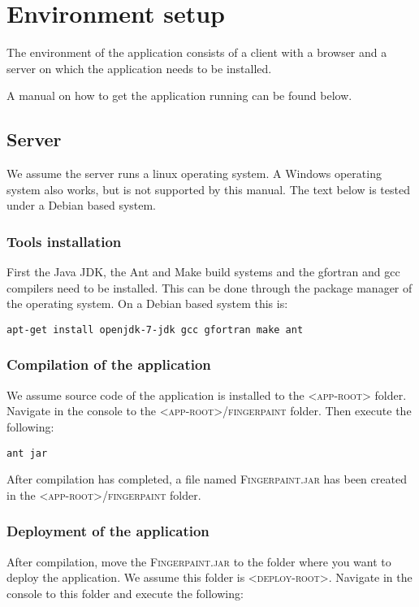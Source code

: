 \chapter{Environment setup}
\label{environment_setup}
The environment of the \applicationname{} application consists of a client with a browser and a server on which the application needs to be installed.

A manual on how to get the \applicationname{} application running can be found below.

\section{Server}
We assume the server runs a linux operating system. A Windows operating system also works, but is not supported by this manual. The text below is tested under a Debian based system.

\subsection{Tools installation}
First the Java JDK, the Ant and Make build systems and the gfortran and gcc compilers need to be installed. This can be done through the package manager of the operating system. On a Debian based system this is:

\begin{verbatim}
apt-get install openjdk-7-jdk gcc gfortran make ant
\end{verbatim}

\subsection{Compilation of the application}
We assume source code of the application is installed to the \textsc{<app-root>} folder. Navigate in the console to the \textsc{<app-root>/fingerpaint} folder. Then execute the following:

\begin{verbatim}
ant jar
\end{verbatim}

After compilation has completed, a file named \textsc{Fingerpaint.jar} has been created in the \textsc{<app-root>/fingerpaint} folder.

\subsection{Deployment of the application}
After compilation, move the \textsc{Fingerpaint.jar} to the folder where you want to deploy the application. We assume this folder is \textsc{<deploy-root>}. Navigate in the console to this folder and execute the following:

